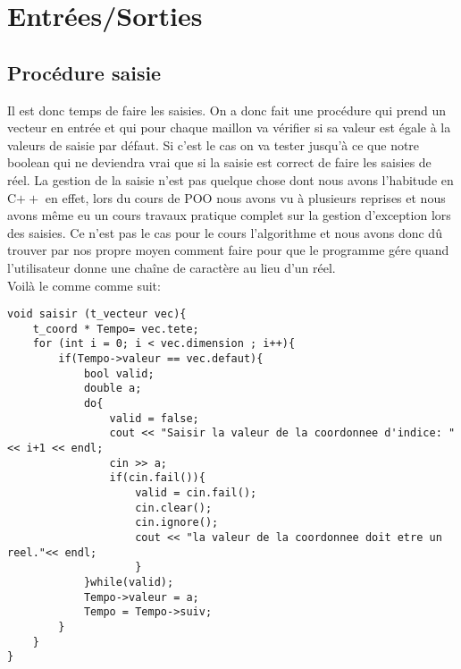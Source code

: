 \documentclass[a4paper,11pt,final]{article}
\begin{document}
\section{Entrées/Sorties}
\subsection{Procédure saisie}

Il est donc temps de faire les saisies. On a donc fait une procédure qui prend un vecteur en entrée et qui pour chaque maillon va vérifier si sa valeur est égale à la valeurs de saisie par défaut. Si c'est le cas on va tester jusqu'à ce que notre boolean qui ne deviendra vrai que si la saisie est correct de faire les saisies de réel. La gestion de la saisie n'est pas quelque chose dont nous avons l'habitude en C$++$ en effet, lors du cours de POO nous avons vu à plusieurs reprises et nous avons même eu un cours travaux pratique complet sur la gestion d'exception lors des saisies. Ce n'est pas le cas pour le cours l'algorithme et nous avons donc dû trouver par nos propre moyen comment faire pour que le programme gére quand l'utilisateur donne une chaîne de caractère au lieu d'un réel. \\
Voilà le comme comme suit:
\begin{verbatim}
void saisir (t_vecteur vec){
    t_coord * Tempo= vec.tete;
    for (int i = 0; i < vec.dimension ; i++){
        if(Tempo->valeur == vec.defaut){
            bool valid;
            double a;
            do{
                valid = false;
                cout << "Saisir la valeur de la coordonnee d'indice: "<< i+1 << endl;
                cin >> a;
                if(cin.fail()){
                    valid = cin.fail();
                    cin.clear();
                    cin.ignore();
                    cout << "la valeur de la coordonnee doit etre un reel."<< endl;
                    }
            }while(valid);
            Tempo->valeur = a;
            Tempo = Tempo->suiv;
        }
    }
}
\end{verbatim}
\end{document}
